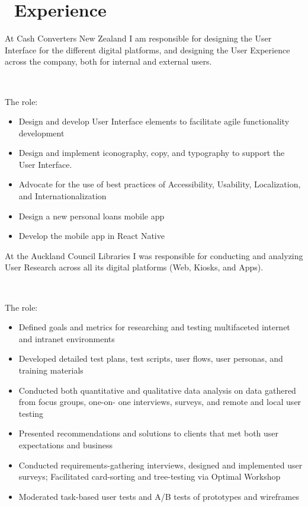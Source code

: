 \documentclass{resume}
\begin{document}
\section{\faUsers\ Experience}
  At Cash Converters New Zealand I am responsible for designing the User Interface for the different digital platforms, and designing the User Experience across the company, both for internal and external users.\par
  ~\par
  {The role:}\par
  \begin{itemize}
    \item Design and develop User Interface elements to facilitate agile functionality development
    \item Design and implement iconography, copy, and typography to support the User Interface.
    \item Advocate for the use of best practices of Accessibility, Usability, Localization, and Internationalization
    \item Design a new personal loans mobile app
    \item Develop the mobile app in React Native
  \end{itemize}
  At the Auckland Council Libraries I was responsible for conducting and analyzing User Research across all its digital platforms (Web, Kiosks, and Apps).\par
  ~\par
  {The role:}\par
  \begin{itemize}
    \item Defined goals and metrics for researching and testing multifaceted internet and intranet environments
    \item Developed detailed test plans, test scripts, user flows, user personas, and training materials
    \item Conducted both quantitative and qualitative data analysis on data gathered from focus groups, one-on- one interviews, surveys, and remote and local user testing
    \item Presented recommendations and solutions to clients that met both user expectations and business
    \item Conducted requirements-gathering interviews, designed and implemented user surveys; Facilitated card-sorting and tree-testing via Optimal Workshop
    \item Moderated task-based user tests and A/B tests of prototypes and wireframes
  \end{itemize}
\end{document}
